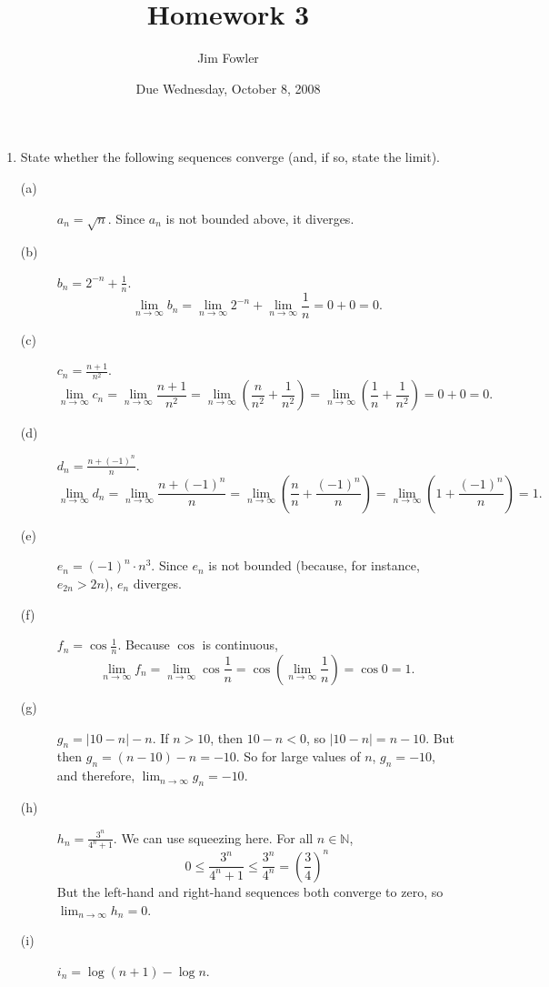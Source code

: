 \documentclass[12pt]{article}
\title{Homework 3}
\author{Jim Fowler}
\date{Due Wednesday, October 8, 2008}
\newcommand{\N}{\mathbb{N}}
\begin{document}
\maketitle

\begin{enumerate}

\item State whether the following sequences converge (and, if so,
  state the limit).

\begin{description}
\item[(a)] $a_n = \sqrt{n}$.  Since $a_n$ is not bounded above, it diverges.
\vfill
\item[(b)] $b_n = 2^{-n} + \frac{1}{n}$.
$$
\lim_{n \to \infty} b_n = \lim_{n \to \infty} 2^{-n} + \lim_{n \to \infty} \frac{1}{n} = 0 + 0 = 0.
$$
\vfill
\item[(c)] $c_n = \displaystyle\frac{n+1}{n^2}$.
$$
\lim_{n \to \infty} c_n = \lim_{n \to \infty} \frac{n+1}{n^2} = \lim_{n \to \infty} \left( \frac{n}{n^2} + \frac{1}{n^2} \right) = \lim_{n \to \infty} \left( \frac{1}{n} + \frac{1}{n^2} \right) = 0 + 0 = 0.
$$
\vfill
\item[(d)] $d_n = \displaystyle\frac{n + (-1)^n}{n}$.
$$
\lim_{n \to \infty} d_n = \lim_{n \to \infty} \frac{n + (-1)^n}{n} = \lim_{n \to \infty} \left( \frac{n}{n} + \frac{(-1)^n}{n} \right) = \lim_{n \to \infty} \left( 1 + \frac{(-1)^n}{n} \right) = 1.
$$
\vfill
\item[(e)] $e_n = (-1)^n \cdot n^3$.  Since $e_n$ is not bounded (because, for instance, $e_{2n} > 2n$), $e_n$ diverges.
\vfill
\item[(f)] $f_n = \cos \displaystyle\frac{1}{n}$.  Because $\cos$ is continuous,
$$
\lim_{n \to \infty} f_n = \lim_{n \to \infty} \cos \displaystyle\frac{1}{n} = \cos \left( \lim_{n \to \infty} \displaystyle\frac{1}{n} \right) = \cos 0 = 1.
$$
\vfill
\item[(g)] $g_n = \left|10 - n\right| - n$.  If $n > 10$, then $10 - n
  < 0$, so $\left| 10 - n \right| = n - 10$.  But then $g_n = (n - 10)
  - n = -10$.  So for large values of $n$, $g_n = -10$, and therefore, $\displaystyle\lim_{n \to \infty} g_n = -10$.
 \vfill
\item[(h)] $h_n = \displaystyle\frac{3^n}{4^n + 1}$.  We can use squeezing here.  For all $n \in \N$,
$$
0 \leq \frac{3^n}{4^n + 1} \leq \frac{3^n}{4^n} = \left(\frac{3}{4}\right)^n
$$
But the left-hand and right-hand sequences both converge to zero, so $\displaystyle\lim_{n \to \infty} h_n = 0$.
\vfill
\item[(i)] $i_n = \log \left(n+1\right) - \log n$.

\end{description}
\end{enumerate}
\end{document}
